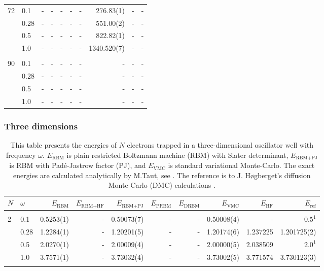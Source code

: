 \begin{landscape}
\begin{table} [H]
\begin{tabularx}{\hsize}{l:l|RRRRRRRR}
		72 & 0.1 & - & - & - & - & - & 276.83(1) & - & - \\ 
		& 0.28 & - & - & - & - & - & 551.00(2) & - & - \\
		& 0.5 & - & - & - & - & - & 822.82(1) & - & - \\
		& 1.0 & - & - & - & - & - & 1340.520(7) & - & - \\ \hdashline \\
		
		90 & 0.1 & - & - & - & - & - & - & - & - \\ 
		& 0.28 & - & - & - & - & - & - & - & - \\
		& 0.5 & - & - & - & - & - & - & - & - \\
		& 1.0 & - & - & - & - & - & - & - & - \\ \hline\hline
	\end{tabularx}
\end{table}

\subsubsection{Three dimensions}
\begin{table} [H]
	\caption{This table presents the energies of $N$ electrons trapped in a three-dimensional oscillator well with frequency $\omega$. $E_{\text{RBM}}$ is plain restricted Boltzmann machine (RBM) with Slater determinant, $E_{\text{RBM+PJ}}$ is RBM with Padé-Jastrow factor (PJ), and $E_{\text{VMC}}$ is standard variational Monte-Carlo. The exact energies are calculated analytically by M.Taut, see \cite{taut_two_1993}. The reference is to J. Høgberget's diffusion Monte-Carlo (DMC) calculations \cite{hogberget_quantum_2013}. } 
	\begin{tabularx}{\hsize}{l:l|RRRRRRRR} \hline\hline
		\label{tab:quantumdotswinteraction3D}
		$N$ & $\omega$ & $E_{\text{RBM}}$ & $E_{\text{RBM+HF}}$ & $E_{\text{RBM+PJ}}$ & $E_{\text{PRBM}}$ & $E_{\text{DRBM}}$ & $E_{\text{VMC}}$ & $E_{\text{HF}} $ & $E_{\text{ref}}$ \\ \hline \\
		2 & 0.1 & 0.5253(1) & - & 0.50073(7) & - & - & 0.50008(4) & - & $0.5^{1}$ \\
		& 0.28 & 1.2284(1) & - & 1.20201(5) & - & - & 1.20174(6) & 1.237225 & 1.201725(2) \\
		& 0.5 & 2.0270(1) & - & 2.00009(4) & - & - & 2.00000(5) & 2.038509 & $2.0^{1}$ \\
		& 1.0 & 3.7571(1) & - & 3.73032(4) & - & - & 3.73002(5) & 3.771574 & 3.730123(3) \\ \hdashline \\
		

\end{tabularx}
\end{table}
\end{landscape}
